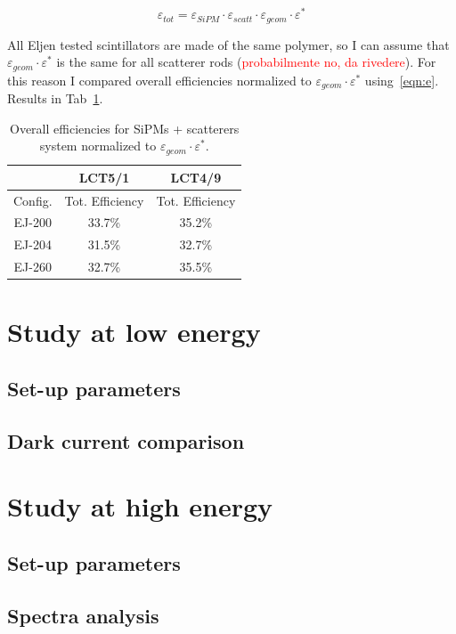 \documentclass[10pt,a4paper, openany]{book}
\begin{document}
\begin{equation}
\varepsilon_{tot} = \varepsilon_{SiPM} \cdot \varepsilon_{scatt} \cdot \varepsilon_{geom} \cdot \varepsilon^*
\end{equation}

All Eljen tested scintillators are made of the same polymer, so I can assume that $\varepsilon_{geom} \cdot \varepsilon^*$ is the same for all scatterer rods (\textcolor{red}{probabilmente no, da rivedere}). For this reason I compared overall efficiencies normalized to $\varepsilon_{geom} \cdot \varepsilon^*$ using~\ref{eqn:e}. Results in Tab~\ref{tab:eff}.

\begin{center}
\begin{table}
\label{tab:eff}
\caption{Overall efficiencies for SiPMs + scatterers system normalized to $\varepsilon_{geom} \cdot \varepsilon^*$.}
\begin{tabular}{ccc}
 &\textbf{LCT5/1} & \textbf{LCT4/9} \\
\toprule
Config. & Tot. Efficiency & Tot. Efficiency\\
\midrule
EJ-200 & 33.7\% & 35.2\%\\
EJ-204 & 31.5\% & 32.7\% \\
EJ-260 & 32.7\% & 35.5\%\\
\bottomrule
\end{tabular}
\end{table}
\end{center}


\section{Study at low energy}
\subsection{Set-up parameters}
\subsection{Dark current comparison}

\section{Study at high energy}
\subsection{Set-up parameters}
\subsection{Spectra analysis}
\end{document}
